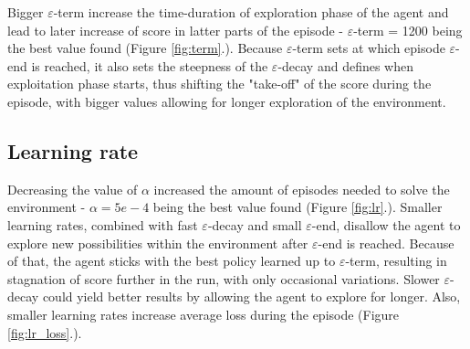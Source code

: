 \documentclass{article}
\begin{document}
Bigger $\varepsilon$-term increase the time-duration of exploration phase of the agent and lead to later increase of score in latter parts of the episode - $\varepsilon$-term = 1200 being the best value found (Figure \ref{fig:term}.). Because $\varepsilon$-term sets at which episode $\varepsilon$-end is reached, it also sets the steepness of the $\varepsilon$-decay and defines when exploitation phase starts, thus shifting the "take-off" of the score during the episode, with bigger values allowing for longer exploration of the environment.


\subsection*{Learning rate}
Decreasing the value of $\alpha$ increased the amount of episodes needed to solve the environment - $\alpha = 5e-4$ being the best value found (Figure \ref{fig:lr}.). Smaller learning rates, combined with fast $\varepsilon$-decay and small $\varepsilon$-end, disallow the agent to explore new possibilities within the environment after $\varepsilon$-end is reached. Because of that, the agent sticks with the best policy learned up to $\varepsilon$-term, resulting in stagnation of score further in the run, with only occasional variations. Slower $\varepsilon$-decay could yield better results by allowing the agent to explore for longer. Also, smaller learning rates increase average loss during the episode (Figure \ref{fig:lr_loss}.).

\newpage
{}
\end{document}
